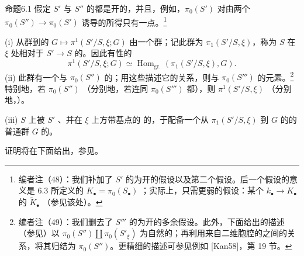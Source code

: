 \begin{SGAresult}{命题}{6.1}
假定 $S'$ 与 $S''$ 的都是开的，并且，例如，$\pi_0(S')$ 对由两个 $\pi_0(S'')\to\pi_0(S')$ 诱导的所得只有一点。\footnote{编者注（48）：我们补加了 $S'$ 的为开的假设以及第二个假设。后一个假设的意义是 6.3 所定义的 $K_\bullet=\pi_0(S_\bullet)$ ；实际上，只需更弱的假设：某个 $k_\bullet\to K_\bullet$ 的 $\widetilde K_\bullet$ （参见该处）。}

(i) 从群到的 $G\mapsto\pi^1(S'/S,\xi;G)$ 由一个群；记此群为 $\pi_1(S'/S,\xi)$，称为 $S$ 在 $\xi$ 处相对于 $S'\to S$ 的。因此有性的
\[
\pi^1(S'/S,\xi;G)\simeq\operatorname{Hom}_{\mathrm{gr.}}(\pi_1(S'/S,\xi),G).
\]
(ii) 此群有一个与 $\pi_0(S'')$ 的；用这些描述它的关系，则与 $\pi_0(S''')$ 的元素。\footnote{编者注（49）：我们删去了 $S'''$ 的为开的多余假设。此外，下面给出的描述（参见）以 $\pi_0(S'')\amalg\pi_0(S'_\xi)$ 为自然的；再利用来自二维胞腔的之间的关系，将其归结为 $\pi_0(S'')$。更精细的描述可参见例如 [Kan58]，第 19 节。} 特别地，若 $\pi_0(S'')$ （分别地，若连同 $\pi_0(S''')$ 都），则 $\pi^1(S'/S,\xi)$ （分别地，）。

(iii) $S$ 上被 $S'$ 、并在 $\xi$ 上方带基点的 的，于配备一个从 $\pi_1(S'/S,\xi)$ 到 $G$ 的的普通群 $G$ 的。
\end{SGAresult}
证明将在下面给出，参见。

